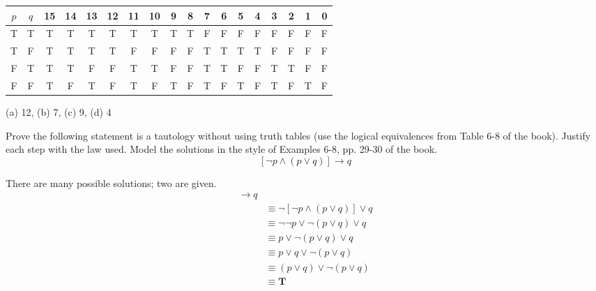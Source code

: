 \documentclass[12pt,addpoints]{exam}
\newcommand{\ra}{\rightarrow}
\begin{document}
\begin{questions}
\begin{center}
 \begin{tabular}{cc|cccc|cccc|cccc|cccc}
    $p$ & $q$ & 15 & 14 & 13 & 12 & 11 & 10 & 9 & 8 & 7 & 6 & 5 & 4 & 3 & 2 & 1 & 0 \\
    \hline
    T & T & T & T & T & T & T & T & T & T & F & F & F & F & F & F & F & F \\
    T & F & T & T & T & T & F & F & F & F & T & T & T & T & F & F & F & F \\
    F & T & T & T & F & F & T & T & F & F & T & T & F & F & T & T & F & F \\
    F & F & T & F & T & F & T & F & T & F & T & F & T & F & T & F & T & F \\
 \end{tabular}
 \end{center}
     \ifprintanswers
        \vspace{-10pt}
    \fi
    \begin{solution} (a) 12, (b) 7, (c) 9, (d) 4
    \end{solution}


\question[9] Prove the following statement is a tautology without using truth tables (use the logical equivalences from Table 6-8 of the book).  Justify each step with the law used.  Model the solutions in the style of Examples 6-8, pp. 29-30 of the book.
\[ [ \neg p \wedge (p \vee q) ] \ra q \]
    \ifprintanswers
        \vspace{-30pt}
    \fi
\begin{solution}  There are many possible solutions; two are given.
\small
    \begin{align*}
        [ \neg p & \wedge (p \vee q) ] \ra q \\
        & \equiv \neg [ \neg p \wedge (p \vee q) ] \vee q \tag{Table 7, rule 1} \\
        & \equiv \neg \neg p \vee \neg (p \vee q) \vee q \tag{DeMorgan's law} \\
        & \equiv p \vee \neg (p \vee q) \vee q \tag{Double Negation} \\
        & \equiv p \vee q \vee \neg (p \vee q) \tag{Commutative} \\
        & \equiv (p \vee q) \vee \neg (p \vee q) \\
        & \equiv \mathbf{T} \tag{Negation} 
    \end{align*}


\end{solution}
\end{questions}
\end{document}
